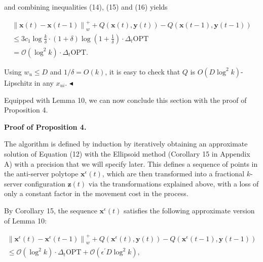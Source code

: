 and combining inequalities (14), (15) and (16) yields\par


\[\begin{gathered}
\displaystyle\left\|{\boldsymbol{x}}(t)-{\boldsymbol{x}}(t-1)\right\|_{w}^{+} \displaystyle+Q({\boldsymbol{x}}(t),{\boldsymbol{y}}(t))-Q({\boldsymbol{x}}(t-1),{\boldsymbol{y}}(t-1)) \\
\displaystyle\leq 3c_{1}\log\frac{k}{\delta}\cdot(1+\delta)\log\left(1+\frac{1}{\delta}\right)\cdot\Delta_{t}{\text{OPT}} \\
\displaystyle=\mathcal{O}\left(\log^{2}k\right)\cdot\Delta_{t}{\text{OPT}}.
\end{gathered}\]


Using $w_{u}\leq D$ and $1/\delta=O(k)$, it is easy to check that $Q$ is $O(D\log^{2}k)$-Lipschitz in any $x_{ui}$.
$\blacktriangleleft$\par




Equipped with Lemma 10, we can now conclude this section with the proof of Proposition 4.\par





\par\medskip\noindent\textbf{Proof of Proposition 4.}\par




The algorithm is defined by induction by iteratively obtaining an approximate solution of Equation (12) with the Ellipsoid method (Corollary 15 in Appendix A) with a precision that we will specify later. This defines a sequence of points in the anti-server polytope ${\boldsymbol{x}}^{\epsilon}(t)$, which are then transformed into a fractional $k$-server configuration ${\mathbf{z}}(t)$ via the transformations explained above, with a loss of only a constant factor in the movement cost in the process.\par




By Corollary 15, the sequence ${\boldsymbol{x}}^{\epsilon}(t)$ satisfies the following approximate version of Lemma 10:\par


\[\begin{gathered}
\displaystyle\left\|{\boldsymbol{x}}^{\epsilon}(t)-{\boldsymbol{x}}^{\epsilon}(t-1)\right\|_{w}^{+}+Q({\boldsymbol{x}}^{\epsilon}(t),{\boldsymbol{y}}(t))-Q \displaystyle({\boldsymbol{x}}^{\epsilon}(t-1),{\boldsymbol{y}}(t-1)) \\
\displaystyle\leq\mathcal{O}\left(\log^{2}k\right)\cdot\Delta_{t}{\text{OPT}}+\mathcal{O}(\epsilon^{\prime}D\log^{2}k),
\end{gathered}\]


